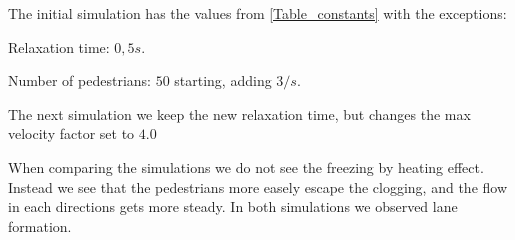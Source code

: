 The initial simulation has the values from \ref{Table_constants} with the exceptions:

\begin{itemize*}
    \item Relaxation time: $0,5 s$.
    \item Number of pedestrians: $50$ starting, adding $3/s$.
\end{itemize*}

The next simulation we keep the new relaxation time, but changes the max velocity factor set to $4.0$


When comparing the simulations we do not see the freezing by heating effect.
Instead we see that the pedestrians more easely escape the clogging, and the flow in each directions
gets more steady. In both simulations we observed lane formation.

